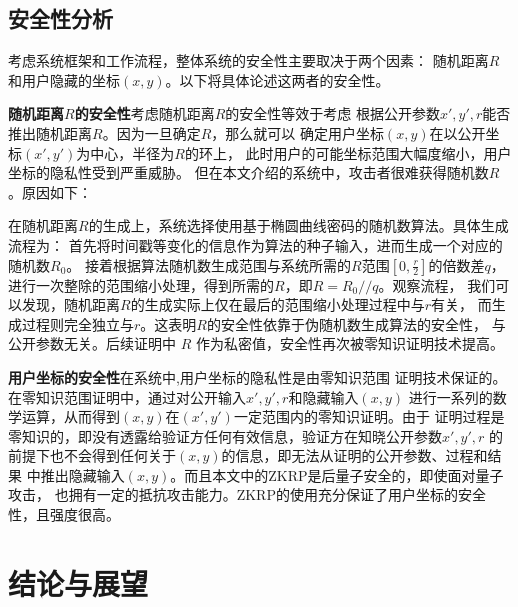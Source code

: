 \documentclass[zihao=-4]{ctexart}
\begin{document}
\subsection{安全性分析}
考虑系统框架和工作流程，整体系统的安全性主要取决于两个因素：
随机距离$R$和用户隐藏的坐标$(x,y)$。以下将具体论述这两者的安全性。\par
\textbf{随机距离$R$的安全性}\quad 考虑随机距离$R$的安全性等效于考虑
根据公开参数$x',y',r$能否推出随机距离$R$。因为一旦确定$R$，那么就可以
确定用户坐标$(x,y)$在以公开坐标$(x',y')$为中心，半径为$R$的环上，
此时用户的可能坐标范围大幅度缩小，用户坐标的隐私性受到严重威胁。
但在本文介绍的系统中，攻击者很难获得随机数$R$。原因如下：\par
在随机距离$R$的生成上，系统选择使用基于椭圆曲线密码的随机数算法。具体生成流程为：
首先将时间戳等变化的信息作为算法的种子输入，进而生成一个对应的随机数$R_0$。
接着根据算法随机数生成范围与系统所需的$R$范围$[0,\frac{r}{2}]$的倍数差$q$，
进行一次整除的范围缩小处理，得到所需的$R$，即$R=R_0//q$。观察流程，
我们可以发现，随机距离$R$的生成实际上仅在最后的范围缩小处理过程中与$r$有关，
而生成过程则完全独立与$r$。这表明$R$的安全性依靠于伪随机数生成算法的安全性，
与公开参数无关。后续证明中 $R$ 作为私密值，安全性再次被零知识证明技术提高。
\par
\textbf{用户坐标的安全性}\quad 在系统中,用户坐标的隐私性是由零知识范围
证明技术保证的。在零知识范围证明中，通过对公开输入$x',y',r$和隐藏输入$(x,y)$
进行一系列的数学运算，从而得到$(x,y)$在$(x',y')$一定范围内的零知识证明。由于
证明过程是零知识的，即没有透露给验证方任何有效信息，验证方在知晓公开参数$x',y',r$
的前提下也不会得到任何关于$(x,y)$的信息，即无法从证明的公开参数、过程和结果
中推出隐藏输入$(x,y)$。而且本文中的ZKRP是后量子安全的，即使面对量子攻击，
也拥有一定的抵抗攻击能力。ZKRP的使用充分保证了用户坐标的安全性，且强度很高。
\section{结论与展望}
\end{document}
